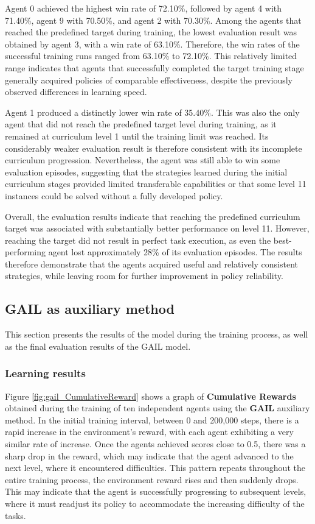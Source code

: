 Agent 0 achieved the highest win rate of 72.10\%, followed by agent 4 with 71.40\%, agent 9 with 70.50\%, and agent 2 with 70.30\%. Among the agents that reached the predefined target during training, the lowest evaluation result was obtained by agent 3, with a win rate of 63.10\%. Therefore, the win rates of the successful training runs ranged from 63.10\% to 72.10\%. This relatively limited range indicates that agents that successfully completed the target training stage generally acquired policies of comparable effectiveness, despite the previously observed differences in learning speed.

Agent 1 produced a distinctly lower win rate of 35.40\%. This was also the only agent that did not reach the predefined target level during training, as it remained at curriculum level 1 until the training limit was reached. Its considerably weaker evaluation result is therefore consistent with its incomplete curriculum progression. Nevertheless, the agent was still able to win some evaluation episodes, suggesting that the strategies learned during the initial curriculum stages provided limited transferable capabilities or that some level 11 instances could be solved without a fully developed policy.

Overall, the evaluation results indicate that reaching the predefined curriculum target was associated with substantially better performance on level 11. However, reaching the target did not result in perfect task execution, as even the best-performing agent lost approximately 28\% of its evaluation episodes. The results therefore demonstrate that the agents acquired useful and relatively consistent strategies, while leaving room for further improvement in policy reliability.
\subsection{GAIL as auxiliary method}
This section presents the results of the model during the training process, as well as the final evaluation results of the GAIL model.
\subsubsection{Learning results}
Figure \ref{fig:gail_CumulativeReward} shows a graph of \textbf{Cumulative Rewards} obtained during the training of ten independent agents using the \textbf{GAIL} auxiliary method. In the initial training interval, between 0 and 200,000 steps, there is a rapid increase in the environment’s reward, with each agent exhibiting a very similar rate of increase. Once the agents achieved scores close to 0.5, there was a sharp drop in the reward, which may indicate that the agent advanced to the next level, where it encountered difficulties. This pattern repeats throughout the entire training process, the environment reward rises and then suddenly drops. This may indicate that the agent is successfully progressing to subsequent levels, where it must readjust its policy to accommodate the increasing difficulty of the tasks.

